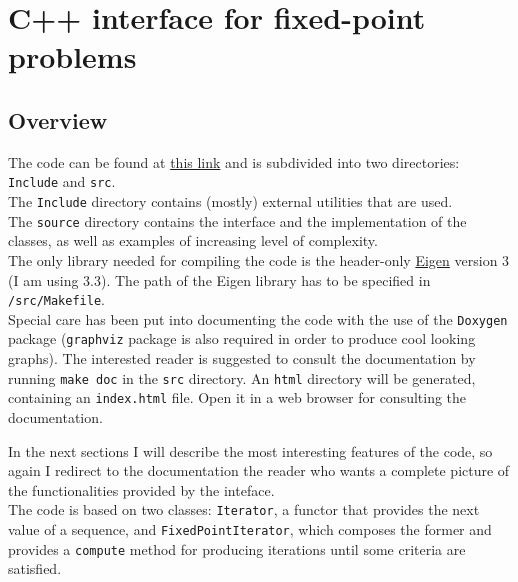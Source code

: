 \documentclass[12pt]{article}
\begin{document}
					
		\section{C++ interface for fixed-point problems}
		\label{sec:C++}
		
		\subsection{Overview}

		The code can be found at \href{https://github.com/martinoischia/Anderson-acceleration}{this link} and is subdivided into two directories:
		\verb|Include| and \verb|src|.\\
		The \verb|Include| directory contains (mostly) external utilities that
		are used.\\
		The \verb|source| directory contains the interface and the implementation of the classes, as well as
		examples of increasing level of complexity.\\
		The only library needed for compiling the code is the header-only \href{http://eigen.tuxfamily.org/}{Eigen}
		version 3 (I am using 3.3). The path of the Eigen library has to be specified in \verb|/src/Makefile|.\\
		Special care has been put into documenting the code with the use of the \verb|Doxygen| package 
		(\verb|graphviz| package is also required in order to produce cool looking graphs). The interested reader
		is suggested to consult the documentation by running \verb|make doc| in the \verb|src| directory.
		An \verb|html| directory will be generated, containing an \verb|index.html| file. Open it in a web browser for consulting the documentation.
		
		In the next sections I will describe the most interesting features of the code, so again I redirect to the documentation the reader
		who wants a complete picture of the functionalities provided by the inteface.\\
		The code is based on two classes: \verb|Iterator|,
		a functor that provides the next value of a sequence, and
		\verb|FixedPointIterator|, which composes the former and
		provides a \verb|compute| method for producing iterations until some criteria are satisfied.
		
		
\end{document}
